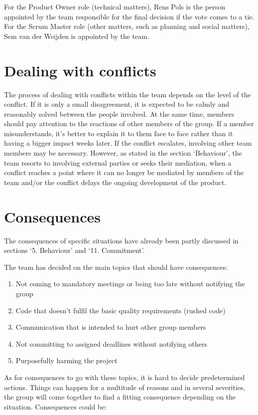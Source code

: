 \documentclass[sigconf,nonacm]{acmart}
\begin{document}
For the Product Owner role (technical matters), Rens Pols is the person appointed by the team responsible for the final decision if the vote comes to a tie.
For the Scrum Master role (other matters, such as planning and social matters), Sem van der Weijden is appointed by the team.

\section{Dealing with conflicts}
The process of dealing with conflicts within the team depends on the level of the conflict. If it is only a small disagreement, it is expected to be calmly and reasonably solved between the people involved. At the same time, members should pay attention to the reactions of other members of the group. If a member misunderstands, it's better to explain it to them face to face rather than it having a bigger impact weeks later. If the conflict escalates, involving other team members may be necessary. However, as stated in the section ‘Behaviour’, the team resorts to involving external parties or seeks their mediation, when a conflict reaches a point where it can no longer be mediated by members of the team and/or the conflict delays the ongoing development of the product.



\section{Consequences}
The consequences of specific situations have already been partly discussed in sections ‘5. Behaviour’ and ‘11. Commitment’.

The team has decided on the main topics that should have consequences:
\begin{enumerate}
    \item Not coming to mandatory meetings or being too late without notifying the group
    \item Code that doesn’t fulfil the basic quality requirements (rushed code)
    \item Communication that is intended to hurt other group members
    \item Not committing to assigned deadlines without notifying others
    \item Purposefully harming the project
\end{enumerate}

As for consequences to go with these topics, it is hard to decide predetermined actions. Things can happen for a multitude of reasons and in several severities, the group will come together to find a fitting consequence depending on the situation. Consequences could be:
\end{document}
